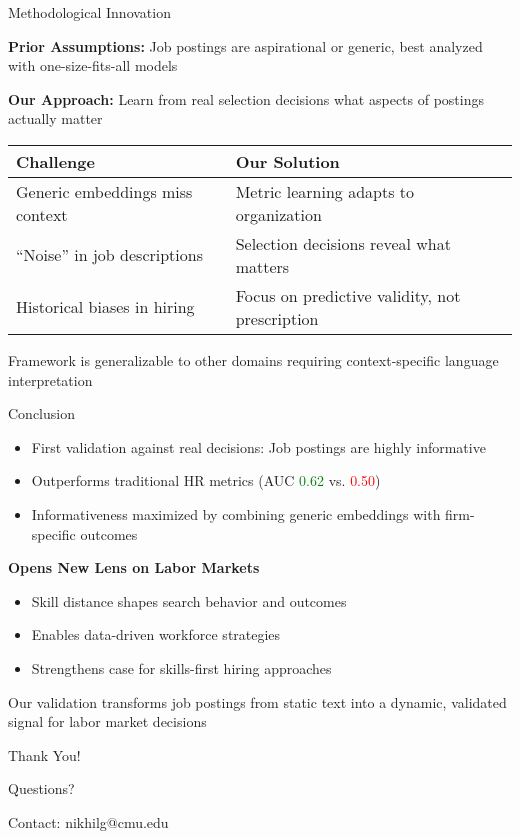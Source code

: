 \documentclass{beamer}
\begin{document}
\begin{frame}{Methodological Innovation}
\begin{tcolorbox}[colback=boxbackground,colframe=boxframe,sharp corners]
\textbf{Prior Assumptions:}
Job postings are aspirational or generic, best analyzed with one-size-fits-all models
\end{tcolorbox}

\begin{tcolorbox}[colback=boxbackground,colframe=boxframe,sharp corners]
\textbf{Our Approach:}
Learn from real selection decisions what aspects of postings actually matter
\end{tcolorbox}

\begin{table}
\centering
\begin{tabular}{l l}
\toprule
\textbf{Challenge} & \textbf{Our Solution} \\
\midrule
Generic embeddings miss context & Metric learning adapts to organization \\
``Noise'' in job descriptions & Selection decisions reveal what matters \\
Historical biases in hiring & Focus on predictive validity, not prescription \\
\bottomrule
\end{tabular}
\end{table}

Framework is generalizable to other domains requiring context-specific language interpretation
\end{frame}

\begin{frame}{Conclusion}
\begin{itemize}
    \item First validation against real decisions: Job postings are highly informative
    \item Outperforms traditional HR metrics (AUC \textcolor{green}{0.62} vs. \textcolor{red}{0.50})
    \item Informativeness maximized by combining generic embeddings with firm-specific outcomes
\end{itemize}

\begin{tcolorbox}[colback=boxbackground,colframe=boxframe,sharp corners]
\textbf{Opens New Lens on Labor Markets}
\begin{itemize}
    \item Skill distance shapes search behavior and outcomes
    \item Enables data-driven workforce strategies
    \item Strengthens case for skills-first hiring approaches
\end{itemize}
\end{tcolorbox}

Our validation transforms job postings from static text into a dynamic, validated signal for labor market decisions
\end{frame}

\begin{frame}
\centering
\huge Thank You!

\vspace{2em}
\Large Questions?

\vspace{2em}
\normalsize Contact: nikhilg@cmu.edu
\end{frame}
\end{document}
